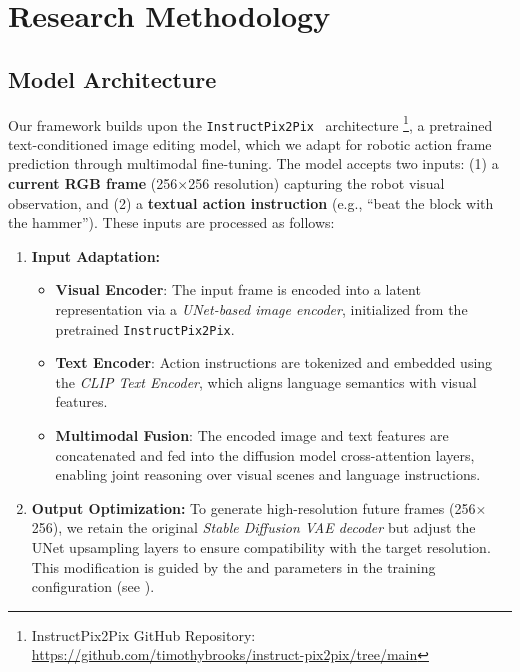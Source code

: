 \section{Research Methodology}
\label{sec:research-methodology}

\subsection{Model Architecture}
\label{sec:model-architecture}

Our framework builds upon the \texttt{InstructPix2Pix}~\cite{brooks2023instructpix2pixlearningfollowimage} architecture
\footnote{InstructPix2Pix GitHub Repository: \url{https://github.com/timothybrooks/instruct-pix2pix/tree/main}}, 
    a pretrained text-conditioned image editing model, 
        which we adapt for robotic action frame prediction through multimodal fine-tuning. 
The model accepts two inputs: 
    (1) a \textbf{current RGB frame} (256$\times$256 resolution) capturing the robot visual observation, and 
    (2) a \textbf{textual action instruction} (e.g., “beat the block with the hammer”). 
These inputs are processed as follows:
\begin{enumerate}
    \item \textbf{Input Adaptation:}
        \begin{itemize}
            \item \textbf{Visual Encoder}: 
            The input frame is encoded into a latent representation via a \textit{UNet-based image encoder}, 
                initialized from the pretrained \texttt{InstructPix2Pix}.
            \item \textbf{Text Encoder}:
            Action instructions are tokenized and embedded using the \textit{CLIP Text Encoder}, 
                which aligns language semantics with visual features.
            \item \textbf{Multimodal Fusion}:
            The encoded image and text features are concatenated and fed into the diffusion model cross-attention layers, 
                enabling joint reasoning over visual scenes and language instructions.
        \end{itemize}
    \item \textbf{Output Optimization:}
    To generate high-resolution future frames (256$\times$256), we retain the original \textit{Stable Diffusion VAE decoder} 
        but adjust the UNet upsampling layers to ensure compatibility with the target resolution. 
    This modification is guided by the  and  
        parameters in the training configuration (see ).
\end{enumerate}

